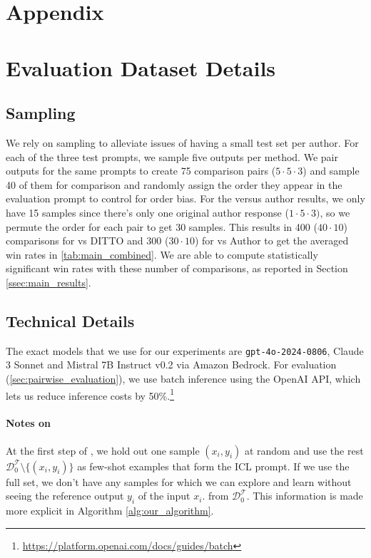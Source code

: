 \section*{Appendix}
\label{sec:appendix}




\section{Evaluation Dataset Details}
\label{appdx:dataset_details}

\subsection{Sampling}
\label{appdx:sampling}
We rely on sampling to alleviate issues of having a small test set per author. 
For each of the three test prompts, we sample five outputs per method. 
We pair outputs for the same prompts to create 75 comparison pairs ($5\cdot5\cdot3$) and sample 40 of them for comparison and randomly assign the order they appear in the evaluation prompt to control for order bias. 
For the versus author results, we only have 15 samples since there’s only one original author response ($1\cdot5\cdot3)$, so we permute the order for each pair to get 30 samples. 
This results in 400 ($40\cdot10$) comparisons for vs DITTO and 300 ($30\cdot10$) for vs Author to get the averaged win rates in \autoref{tab:main_combined}. 
We are able to compute statistically significant win rates with these number of comparisons, as reported in Section \ref{ssec:main_results}.

\subsection{Technical Details}
\label{appdx:technical_details}

The exact models that we use for our experiments are \texttt{gpt-4o-2024-0806}, Claude 3 Sonnet and Mistral 7B Instruct v0.2 via Amazon Bedrock. 
For evaluation (\textsection \ref{sec:pairwise_evaluation}), we use batch inference using the OpenAI API, which lets us reduce inference costs by 50\%.\footnote{\url{https://platform.openai.com/docs/guides/batch}} 

\paragraph{Notes on \ours}
At the first step of \ours, we hold out one sample $(x_i, y_i)$ at random and use the rest   $\mathcal{D}^{\mathcal{T}}_0\setminus\{(x_i, y_i)\}$ as few-shot examples that form the ICL prompt.
If we use the full set, we don't have any samples for which we can explore and learn  without seeing the reference output $y_i$ of the input $x_i$. from $\mathcal{D}^{\mathcal{T}}_0$.
This information is made more explicit in Algorithm \ref{alg:our_algorithm}. 



